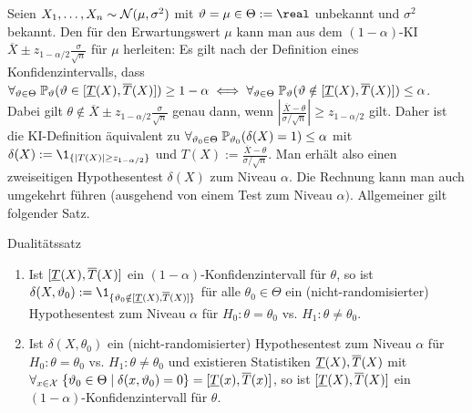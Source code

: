 \begin{Bsp}
    Seien $X_1, \dotsc, X_n \sim \mathcal{N}(\mu, \sigma^2)$ mit $\theta = \mu \in \Theta := \real$
    unbekannt und $\sigma^2$ bekannt.
    Den  für den Erwartungswert $\mu$ kann man
    aus dem $(1 - \alpha)$-KI $\overline{X} \pm z_{1-\alpha/2}
    \frac{\sigma}{\sqrt{n}}$ für $\mu$ herleiten:
    Es gilt nach der Definition eines Konfidenzintervalls, dass\\
    $\forall_{\vartheta \in \Theta}\; \mathbb{P}_\vartheta(\vartheta \in [\underline{T}(X), \overline{T}(X)]) \ge 1 - \alpha
    \iff \forall_{\vartheta \in \Theta}\; \mathbb{P}_\vartheta(\vartheta \notin [\underline{T}(X), \overline{T}(X)]) \le \alpha$.
    Dabei gilt $\theta \notin \overline{X} \pm z_{1-\alpha/2} \frac{\sigma}{\sqrt{n}}$
    genau dann, wenn $\left|\frac{\overline{X} - \theta}{\sigma/\sqrt{n}}\right| \ge
    z_{1-\alpha/2}$ gilt.
    Daher ist die KI-Definition äquivalent zu
    $\forall_{\vartheta_0 \in \Theta}\; \mathbb{P}_{\vartheta_0}(\delta(X) = 1) \le \alpha$
    mit $\delta(X) := \1_{\{|T(X)| \ge z_{1-\alpha/2}\}}$ und
    $T(X) := \frac{\overline{X} - \theta}{\sigma/\sqrt{n}}$.
    Man erhält also einen zweiseitigen Hypothesentest $\delta(X)$ zum Niveau $\alpha$.
    Die Rechnung kann man auch umgekehrt führen (ausgehend von einem Test zum Niveau $\alpha)$.
    Allgemeiner gilt folgender Satz.
\end{Bsp}

\begin{Satz}{Dualitätssatz}
    \begin{enumerate}[label=\emph{\alph*)}]
        \item
        Ist $[\underline{T}(X), \overline{T}(X)]$ ein $(1-\alpha)$-Konfidenzintervall für $\theta$,
        so ist $\delta(X, \theta_0) := \1_{\{\theta_0 \notin [\Tu(X), \To(X)]\}}$ für alle
        $\theta_0 \in \Theta$ ein (nicht-randomisierter) Hypothesentest zum Niveau $\alpha$
        für $H_0\colon \theta = \theta_0$ vs. $H_1\colon \theta \not= \theta_0$.
        
        \item
        Ist $\delta(X, \theta_0)$ ein (nicht-randomisierter) Hypothesentest zum Niveau $\alpha$
        für $H_0\colon \theta = \theta_0$ vs. $H_1\colon \theta \not= \theta_0$
        und existieren Statistiken $\underline{T}(X), \overline{T}(X)$ mit
        $\forall_{x \in \mathcal{X}}\; \{\vartheta_0 \in \Theta \;|\; \delta(x, \vartheta_0) = 0\} =
        [\underline{T}(x), \overline{T}(x)]$,
        so ist $[\underline{T}(X), \overline{T}(X)]$ ein $(1-\alpha)$-Konfidenzintervall für $\theta$.
    \end{enumerate}
\end{Satz}

